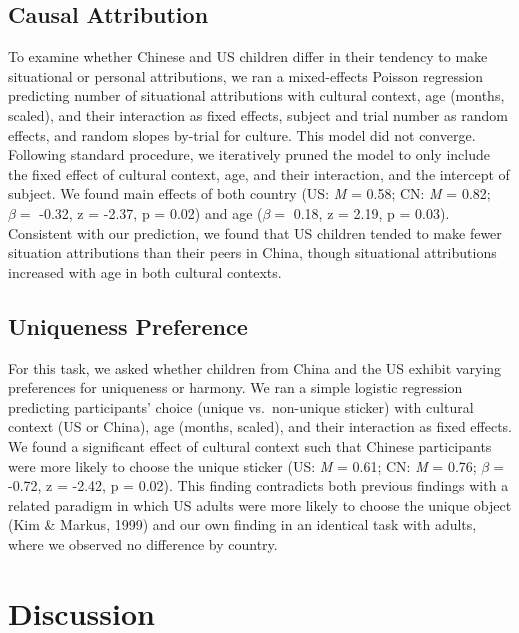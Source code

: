 \documentclass[10pt, letterpaper]{article}
\begin{document}
\hypertarget{causal-attribution-1}{%
\subsection{Causal Attribution}\label{causal-attribution-1}}

To examine whether Chinese and US children differ in their tendency to
make situational or personal attributions, we ran a mixed-effects
Poisson regression predicting number of situational attributions with
cultural context, age (months, scaled), and their interaction as fixed
effects, subject and trial number as random effects, and random slopes
by-trial for culture. This model did not converge. Following standard
procedure, we iteratively pruned the model to only include the fixed
effect of cultural context, age, and their interaction, and the
intercept of subject. We found main effects of both country (US:
\emph{M} = 0.58; CN: \emph{M} = 0.82; \(\beta =\) -0.32, z = -2.37, p =
0.02) and age (\(\beta =\) 0.18, z = 2.19, p = 0.03). Consistent with
our prediction, we found that US children tended to make fewer situation
attributions than their peers in China, though situational attributions
increased with age in both cultural contexts.

\hypertarget{uniqueness-preference-1}{%
\subsection{Uniqueness Preference}\label{uniqueness-preference-1}}

For this task, we asked whether children from China and the US exhibit
varying preferences for uniqueness or harmony. We ran a simple logistic
regression predicting participants' choice (unique vs.~non-unique
sticker) with cultural context (US or China), age (months, scaled), and
their interaction as fixed effects. We found a significant effect of
cultural context such that Chinese participants were more likely to
choose the unique sticker (US: \emph{M} = 0.61; CN: \emph{M} = 0.76;
\(\beta =\) -0.72, z = -2.42, p = 0.02). This finding contradicts both
previous findings with a related paradigm in which US adults were more
likely to choose the unique object (Kim \& Markus, 1999) and our own
finding in an identical task with adults, where we observed no
difference by country.

\hypertarget{discussion}{%
\section{Discussion}\label{discussion}}
\end{document}
